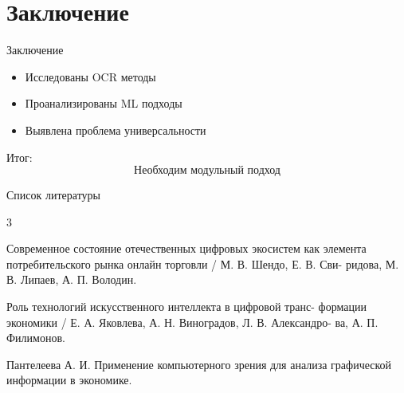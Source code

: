 \documentclass[aspectratio=169]{beamer}
\begin{document}
\section{Заключение}

\begin{frame}{Заключение}

\begin{itemize}
\item Исследованы OCR методы
\item Проанализированы ML подходы
\item Выявлена проблема универсальности
\end{itemize}

\pause

Итог:
\[
\text{Необходим модульный подход}
\]

\end{frame}

\begin{frame}{Список литературы}

\begin{thebibliography}{3}

 Современное состояние отечественных цифровых экосистем как
элемента потребительского рынка онлайн торговли / М. В. Шендо, Е. В. Сви-
ридова, М. В. Липаев, А. П. Володин.

 Роль технологий искусственного интеллекта в цифровой транс-
формации экономики / Е. А. Яковлева, А. Н. Виноградов, Л. В. Александро-
ва, А. П. Филимонов.

 Пантелеева А. И. Применение компьютерного зрения для анализа
графической информации в экономике.

\end{thebibliography}

\end{frame}

\end{document}
